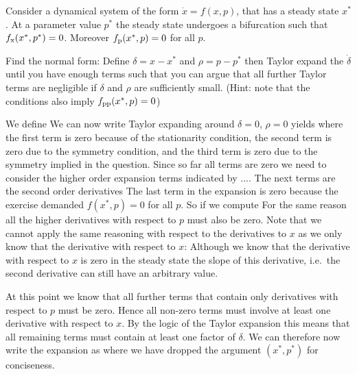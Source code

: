 Consider a dynamical system of the form $\dot{x}=f(x,p)$, that has a steady state $x^*$. At a parameter value $p^*$ the steady state undergoes a bifurcation such that $f_{\rm x}(x^*,p^*)=0$. Moreover $f_{\rm p}(x^*,p)=0$ for all $p$.

\subquestion Find the normal form: Define $\delta=x-x^*$ and $\rho=p-p^*$ then Taylor expand the $\dot{\delta}$ until you have enough terms such that you can argue that all further Taylor terms are negligible if $ \delta$ and $\rho$ are sufficiently small. (Hint: note that the conditions also imply $f_{\rm pp}(x^*,p)=0$)

\solution
We define 
We can now write 
Taylor expanding around $\delta=0$, $\rho=0$ yields 
where the first term is zero because of the stationarity condition, the second term is zero due to the symmetry condition, and the third term is zero due to the symmetry implied in the question. Since so far all terms are zero we need to consider the higher order expansion terms indicated by $\ldots$. The next terms are the second order derivatives
The last term in the expansion is zero because the exercise demanded $f(x^*,p)=0$ for all $p$. So if we compute 
For the same reason all the higher derivatives with respect to $p$ must also be zero. Note that we cannot apply the same reasoning with respect to the derivatives to $x$ as we only know that the derivative with respect to $x$: Although we know that the derivative with respect to $x$ is zero in the steady state the slope of this derivative, i.e.~the second derivative can still have an arbitrary value. 

At this point we know that all further terms that contain only derivatives with respect to $p$ must be zero. Hence all non-zero terms must involve at least one derivative with respect to $x$. By the logic of the Taylor expansion this means that all remaining terms must contain at least one factor of $\delta$. We can therefore now write the expansion as 
where we have dropped the argument $(x^*,p^*)$ for conciseness.

